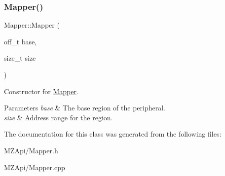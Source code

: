 \subsubsection{\texorpdfstring{Mapper()}{Mapper()}}
{\footnotesize\ttfamily Mapper\+::\+Mapper (\begin{DoxyParamCaption}\item[{off\+\_\+t}]{base,  }\item[{size\+\_\+t}]{size }\end{DoxyParamCaption})}

Constructor for \mbox{\hyperlink{classMapper}{Mapper}}. 
\begin{DoxyParams}{Parameters}
{\em base} & The base region of the peripheral. \\
\hline
{\em size} & Address range for the region. \\
\hline
\end{DoxyParams}


The documentation for this class was generated from the following files\+:\begin{DoxyCompactItemize}
\item 
M\+Z\+Api/Mapper.\+h\item 
M\+Z\+Api/Mapper.\+cpp\end{DoxyCompactItemize}

